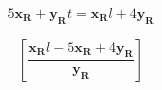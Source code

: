 \documentclass[a3paper,2pt]{article}
\begin{document}
\begin{equation} 
5 \mathbf{{x}_{R}} + \mathbf{{y}_{R}} t = \mathbf{{x}_{R}} l + 4 \mathbf{{y}_{R}}
\end{equation} 

\begin{equation} 
\left[ \frac{\mathbf{{x}_{R}} l - 5 \mathbf{{x}_{R}} + 4 \mathbf{{y}_{R}}}{\mathbf{{y}_{R}}}\right]
\end{equation} 
\end{document}
